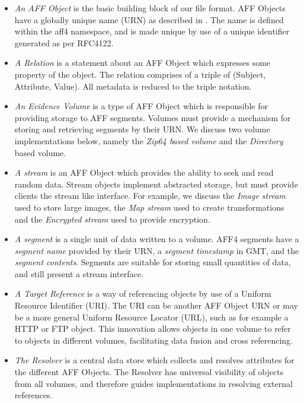 \documentclass[10pt, conference]{IEEEtran}
\begin{document}
\begin{itemize}
\item \emph{An AFF Object} is the basic building block of our
file format. AFF Objects have a globally unique name (URN) as described in
\cite{RFC1737}. The name is defined within the aff4 namespace, and is
made unique by use of a unique identifier generated as per
RFC4122\cite{RFC4122}.

\item \emph{A Relation} is a statement about an AFF Object which
expresses some property of the object. The relation comprises of a
triple of (Subject, Attribute, Value). All metadata is reduced to the
triple notation.

\item \emph{An Evidence Volume} is a type of AFF Object which is
responsible for providing storage to AFF segments. Volumes must
provide a mechanism for storing and retrieving segments by their
URN. We discuss two volume implementations below, namely the {\em
Zip64 based volume} and the {\em Directory} based volume.

\label{definitions}
\item \emph{A stream} is an AFF Object which provides the ability to
  seek and read random data. Stream objects implement abstracted
  storage, but must provide clients the stream like interface. For
  example, we discuss the {\em Image stream} used to store large
  images, the {\em Map stream} used to create transformations and the
  {\em Encrypted stream} used to provide encryption.

\item \emph{A segment} is a single unit of data written to a volume. AFF4
  segments have a \emph{segment name} provided by their URN, a
  \emph{segment timestamp} in GMT, and the \emph{segment
  contents}. Segments are suitable for storing small quantities of
  data, and still present a stream interface.

\item \emph{A Target Reference} is a way of referencing objects by use
  of a Uniform Resource Identifier (URI). The URI can be another AFF
  Object URN or may be a more general Uniform Resource Locator (URL),
  such as for example a HTTP or FTP object. This innovation allows
  objects in one volume to refer to objects in different volumes,
  facilitating data fusion and cross referencing.

\item \emph{The Resolver} is a central data store which collects and resolves
  attributes for the different AFF Objects. The Resolver has universal
  visibility of objects from all volumes, and therefore guides
  implementations in resolving external references.
\end{itemize}
\end{document}
